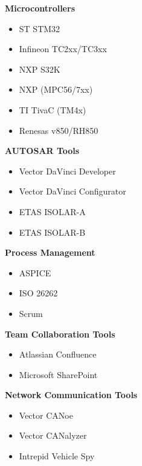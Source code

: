 \begin{minipage}[t]{0.48\textwidth}
\textbf{Microcontrollers}
\begin{itemize}[leftmargin=*,noitemsep,topsep=0pt]
    \item ST STM32 
    \item Infineon TC2xx/TC3xx 
    \item NXP S32K 
    \item NXP (MPC56/7xx) 
    \item TI TivaC (TM4x) 
    \item Renesas v850/RH850 
\end{itemize}

\vspace{0.5em}

\textbf{AUTOSAR Tools}
\begin{itemize}[leftmargin=*,noitemsep,topsep=0pt]
    \item Vector DaVinci Developer 
    \item Vector DaVinci Configurator 
    \item ETAS ISOLAR-A 
    \item ETAS ISOLAR-B 
\end{itemize}

\vspace{0.5em}

\textbf{Process Management}
\begin{itemize}[leftmargin=*,noitemsep,topsep=0pt]
    \item ASPICE 
    \item ISO 26262 
    \item Scrum 
\end{itemize}

\vspace{0.5em}

\textbf{Team Collaboration Tools}
\begin{itemize}[leftmargin=*,noitemsep,topsep=0pt]
    \item Atlassian Confluence 
    \item Microsoft SharePoint 
\end{itemize}

\vspace{0.5em}

\textbf{Network Communication Tools}
\begin{itemize}[leftmargin=*,noitemsep,topsep=0pt]
    \item Vector CANoe 
    \item Vector CANalyzer 
    \item Intrepid Vehicle Spy 
\end{itemize}


\end{minipage}
